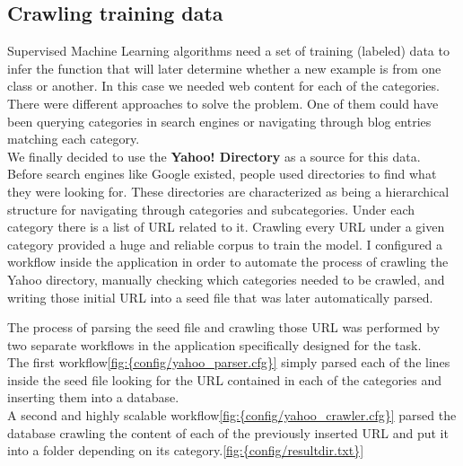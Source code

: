 \subsection{Crawling training data}
Supervised Machine Learning algorithms need a set of training (labeled) data to infer the function that will later determine whether a new example is from one class or another. In this case we needed
web content for each of the categories. There were different approaches to solve the problem. One of them could have been querying categories in search engines or navigating through blog entries matching
each category. \\
We finally decided to use the {\bf Yahoo! Directory}\cite{yahoo} as a source for this data.
Before search engines like Google existed, people used directories to find what they were looking for. These directories are characterized as being a hierarchical structure for navigating through categories
and subcategories. Under each category there is a list of URL related to it.  
Crawling every URL under a given category provided a huge and reliable corpus to train the model.
I configured a workflow inside the application in order to automate the process of crawling the Yahoo directory, manually checking which categories needed to be crawled, and writing those initial URL into 
a seed file that was later automatically parsed.


The process of parsing the seed file and crawling those URL was performed by two separate  workflows in the application specifically designed for the task. \\
The first workflow\ref{fig:{config/yahoo_parser.cfg}} simply parsed each of the lines inside the seed file looking for the URL contained in each of the categories and inserting them into a database. \\
A second and highly scalable workflow\ref{fig:{config/yahoo_crawler.cfg}} parsed the database crawling the content of each of the previously inserted URL and put it into a folder depending on its category.\ref{fig:{config/resultdir.txt}} \\


\clearpage
{}

\clearpage
{}

